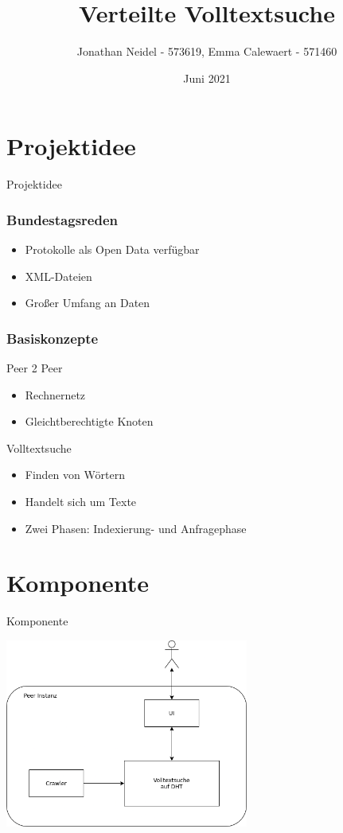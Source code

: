 \documentclass{beamer}
\title{Verteilte Volltextsuche}
\subtitle{}
\author{Jonathan Neidel - 573619, Emma Calewaert - 571460}
\date{Juni 2021}
\institute{HTW Berlin, Angewandte Informatik, Projektstudium bei Herr Hoppe}
\begin{document}
\frame{\titlepage}

\section{Projektidee}
\begin{frame}
  \begin{center}
    {\Huge Projektidee}
  \end{center}
\end{frame}

\begin{frame}
  \frametitle{Bundestagsreden}
  \begin{itemize}
    \item Protokolle als Open Data verfügbar
    \item XML-Dateien
    \item Großer Umfang an Daten
  \end{itemize}
\end{frame}

\begin{frame}
  \frametitle{Basiskonzepte}
  Peer 2 Peer
  \begin{itemize}
    \item Rechnernetz
    \item Gleichtberechtigte Knoten
  \end{itemize}
  Volltextsuche 
    \begin{itemize}
    \item Finden von Wörtern
    \item Handelt sich um Texte
    \item Zwei Phasen: Indexierung- und Anfragephase
  \end{itemize}
\end{frame}

\section{Komponente}
\begin{frame}
  \begin{center}
    {\Huge Komponente}
  \end{center}
\end{frame}

\begin{frame}
  \begin{center}
    \includegraphics[width=8cm]{Komponente-einzeln}
  \end{center}
\end{frame}
\end{document}
